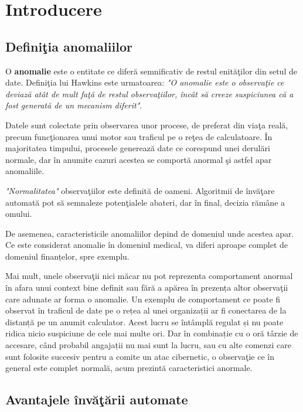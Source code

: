 \chapter{Introducere}

\section{Definiţia anomaliilor}

O \textbf{anomalie} este o entitate ce diferă semnificativ de restul enităţilor din 
setul de date. Definiţia lui Hawkins este urmatoarea\cite{hawkins1980identification}:
\textit{"O anomalie este o observaţie ce deviază atât de mult faţă de restul observaţiilor,
încât să creeze suspiciunea că a fost generată de un mecanism diferit"}.

Datele sunt colectate prin observarea unor procese, de preferat din viaţa reală, 
precum funcţionarea
unui motor sau traficul pe o reţea de calculatoare. În majoritatea timpului, procesele
generează date ce corespund unei derulări normale, dar în anumite cazuri acestea se 
comportă anormal şi astfel apar anomaliile. 

\textit{"Normalitatea"} observaţiilor este definită
de oameni. Algoritmii de învăţare automată pot să semnaleze potenţialele
abateri, dar în final, decizia rămâne a omului.

De asemenea, caracteristicile anomaliilor depind de domeniul 
unde acestea apar. Ce este considerat anomalie în domeniul 
medical, va diferi aproape complet de domeniul finanțelor, 
spre exemplu. 

Mai mult, unele observaţii nici măcar nu 
pot reprezenta comportament anormal în afara unui context 
bine definit sau fără a apărea în prezența altor observaţii
care adunate ar forma o anomalie. Un exemplu de comportament
ce poate fi observat în traficul de date pe o rețea al unei 
organizații ar fi 
conectarea de la distanță pe un anumit calculator. Acest lucru
se întâmplă regulat și nu poate ridica nicio suspiciune de 
cele mai multe ori. Dar în combinație cu o oră târzie de 
accesare, când probabil angajații nu mai sunt la lucru, 
sau cu alte comenzi care sunt folosite succesiv pentru a 
comite un atac cibernetic, o observaţie ce în general 
este complet normală, acum prezintă caracteristici anormale.

\section{Avantajele învăţării automate}


